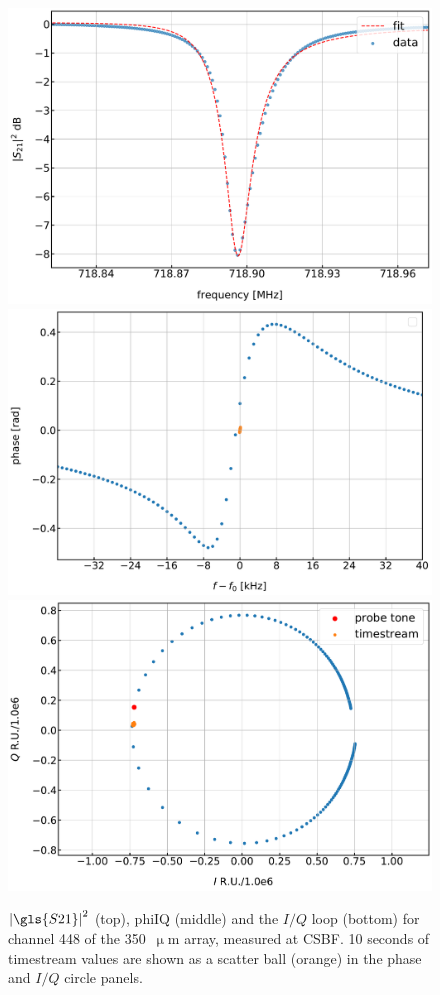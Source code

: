 \begin{figure}[ptbh]
\centering
\caption[~,  and the  loop for the 350~ example channel.]{$\left| \gls{S21} \right|^{2}$ (top), \gls{phiIQ} (middle) and the $I/Q$ loop (bottom) for channel 448 of the 350~$\upmu$m array, measured at CSBF\@. 10 seconds of timestream values are shown as a scatter ball (orange) in the phase and $I/Q$ circle panels.}
\includegraphics[scale=0.3]{figures/blast_data/timestreams/350_pal_S21_fit_448}
\includegraphics[scale=0.3]{figures/blast_data/timestreams/350_pal_freqNoiseBall_448}
\includegraphics[scale=0.3]{figures/blast_data/timestreams/350_pal_noiseball_448}

\end{figure}
